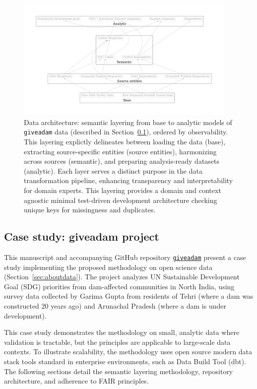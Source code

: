 \documentclass{article}
\begin{document}
\begin{figure}[ht]
  \centering
  \includegraphics[width=0.95\textwidth]{figures/architecture.pdf}
  \caption{Data architecture: semantic layering from base to analytic models of \texttt{giveadam} data (described in Section~\ref{sec:case-study}), ordered by observability. This layering explictly delineates between loading the data (base), extracting source-specific entities (source entities), harmonizing across sources (semantic), and preparing analysis-ready datasets (analytic). Each layer serves a distinct purpose in the data transformation pipeline, enhancing transparency and interpretability for domain experts. This layering provides a domain and context agnostic minimal test-driven development architecture checking unique keys for missingness and duplicates.}
  \label{fig:architecture}
\end{figure}

\subsection{Case study: giveadam project}
\label{sec:case-study}

This manuscript and accompanying GitHub repository \href{https://github.com/softloud/giveadam}{\texttt{giveadam}} present a case study implementing the proposed methodology on open science data (Section~\ref{sec:aboutdata}). The project analyzes UN Sustainable Development Goal (SDG) priorities from dam-affected communities in North India, using survey data collected by Garima Gupta from residents of Tehri (where a dam was constructed 20 years ago) and Arunachal Pradesh (where a dam is under development).

This case study demonstrates the methodology on small, analytic data where validation is tractable, but the principles are applicable to large-scale data contexts. To illustrate scalability, the methodology uses open source modern data stack tools standard in enterprise environments, such as Data Build Tool (dbt). The following sections detail the semantic layering methodology, repository architecture, and adherence to FAIR principles.
\end{document}
